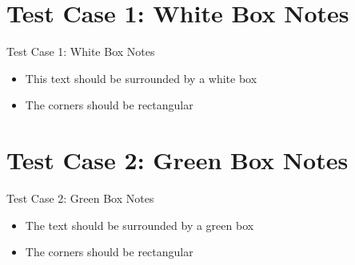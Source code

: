 \documentclass{article}
\begin{document}
\section{Test Case 1: White Box Notes}
\begin{bnote}{Test Case 1: White Box Notes}
    \begin{itemize}
        \item This text should be surrounded by a white box
        \item The corners should be rectangular
    \end{itemize}
\end{bnote}

\section{Test Case 2: Green Box Notes}
\begin{gbox}{Test Case 2: Green Box Notes}
    \begin{itemize}
        \item The text should be surrounded by a green box
        \item The corners should be rectangular
    \end{itemize}
\end{gbox}
\end{document}
